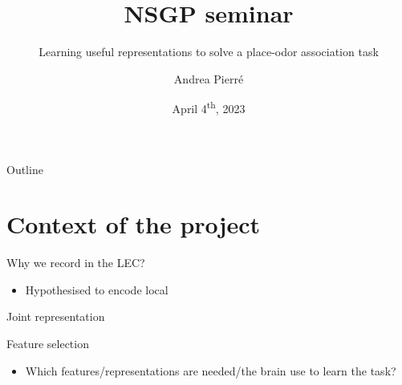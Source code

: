 \documentclass[bigger]{beamer}
\author{Andrea Pierré}
\date{April 4\textsuperscript{th}, 2023}
\title{NSGP seminar}
\subtitle{Learning useful representations to solve a place-odor association task}
\institute{Brown University}
\begin{document}
\maketitle
\begin{frame}[plain]{Outline}
\tableofcontents
\end{frame}

\section{Context of the project}
\label{sec:orgd4e5f00}
\begin{frame}[label={sec:org53479a5}]{Why we record in the LEC?}
\begin{itemize}
\item Hypothesised to encode local
\end{itemize}
\end{frame}
\begin{frame}[label={sec:org5b444a4}]{Joint representation}
\begin{block}{Feature selection}
\begin{itemize}
\item Which features/representations are needed/the brain use to learn the task?
\end{itemize}
\end{block}
\end{frame}
\end{document}
